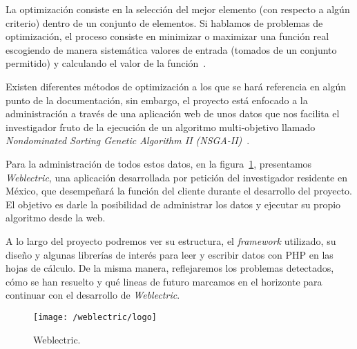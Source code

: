 
La optimización consiste en la selección del mejor elemento (con respecto a algún criterio) dentro de un conjunto de elementos. Si hablamos de problemas de optimización, el proceso consiste en minimizar o maximizar una función real escogiendo de manera sistemática valores de entrada (tomados de un conjunto permitido) y calculando el valor de la función~\cite{wiki:optimizacion}.

Existen diferentes métodos de optimización a los que se hará referencia en algún punto de la documentación, sin embargo, el proyecto está enfocado a la administración a través de una aplicación web de unos datos que nos facilita el investigador fruto de la ejecución de un algoritmo multi-objetivo llamado \textit{Nondominated Sorting Genetic Algorithm II (NSGA-II)}~\cite{pdf:nsga-ii}.

Para la administración de todos estos datos, en la figura~\ref{fig:weblectric}, presentamos \textit{Weblectric}, una aplicación desarrollada por petición del investigador residente en México, que desempeñará la función del cliente durante el desarrollo del proyecto. El objetivo es darle la posibilidad de administrar los datos y ejecutar su propio algoritmo desde la web.

A lo largo del proyecto podremos ver su estructura, el \textit{framework} utilizado, su diseño y algunas librerías de interés para leer y escribir datos con PHP en las hojas de cálculo. De la misma manera, reflejaremos los problemas detectados, cómo se han resuelto y qué lineas de futuro marcamos en el horizonte para continuar con el desarrollo de \textit{Weblectric}. 

\begin{figure}[ht]
	\centering
	\texttt{[image: /weblectric/logo]}
	\caption{Weblectric.}
	\label{fig:weblectric}
\end{figure}